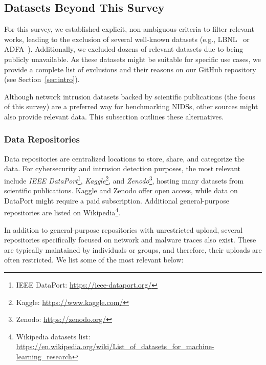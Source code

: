 \subsection{Datasets Beyond This Survey}
\label{ssec:ndatasurv_other_datasets}

For this survey, we established explicit, non-ambiguous criteria to filter relevant works, leading to the exclusion of several well-known datasets (e.g., LBNL~\cite{pang2005_lbnl_dataset} or ADFA~\cite{creech2013_adfa_dataset}). Additionally, we excluded dozens of relevant datasets due to being publicly unavailable. As these datasets might be suitable for specific use cases, we provide a complete list of exclusions and their reasons on our GitHub repository (see Section~\ref{sec:intro}).

Although network intrusion datasets backed by scientific publications (the focus of this survey) are a preferred way for benchmarking NIDSs, other sources might also provide relevant data. This subsection outlines these alternatives.

\subsubsection{Data Repositories}
\label{sssec:ndatasurv_other_repositories}

Data repositories are centralized locations to store, share, and categorize the data. For cybersecurity and intrusion detection purposes, the most relevant include \emph{IEEE DataPort}\footnote{IEEE DataPort: \url{https://ieee-dataport.org/}}, \emph{Kaggle}\footnote{Kaggle: \url{https://www.kaggle.com/}}, and \emph{Zenodo}\footnote{Zenodo: \url{https://zenodo.org/}}, hosting many datasets from scientific publications. Kaggle and Zenodo offer open access, while data on DataPort might require a paid subscription. Additional general-purpose repositories are listed on Wikipedia\footnote{Wikipedia datasets list: \url{https://en.wikipedia.org/wiki/List_of_datasets_for_machine-learning_research}}.

In addition to general-purpose repositories with unrestricted upload, several repositories specifically focused on network and malware traces also exist. These are typically maintained by individuals or groups, and therefore, their uploads are often restricted. We list some of the most relevant below:

